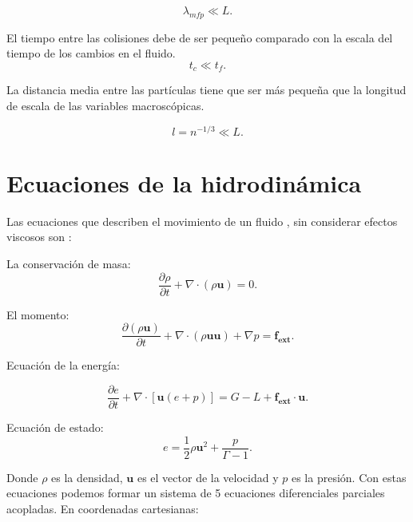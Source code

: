 \documentclass[12pt,a4paper]{book}
\begin{document}
\begin{equation}
\lambda_{mfp} \ll L.
\end{equation}

El tiempo entre las colisiones debe de ser pequeño comparado con la escala del tiempo de los cambios en el fluido.
\begin{equation}
t_{c} \ll t_f.
\end{equation}

La distancia media entre las partículas tiene que ser más pequeña que la longitud de escala de las variables macroscópicas.

\begin{equation}
l = n^{-1/3} \ll L.
\end{equation}



\section{Ecuaciones de la hidrodinámica}\label{sec:Ecuacioneshidrodinamica}

Las ecuaciones que describen el movimiento de un fluido \citep{Clarke2007}, sin considerar efectos viscosos son :

La conservación de masa: 
\begin{equation} \label{conservación_masa_hidrodinamica}
\dfrac{\partial \rho }{\partial t} + \nabla \cdot \left( \rho \mathbf{u} \right)=0.
\end{equation}

El momento:
\begin{equation}  \label{conservacion_momento_hidrodinamica}
\dfrac{\partial \left( \rho \mathbf{u} \right) }{\partial t}+ \nabla \cdot \left( \rho \mathbf{u u} \right) + \nabla p = \mathbf{f_{ext}}.
\end{equation}

Ecuación de la energía:

\begin{equation} \label{conservacion_energia_hidrodinamica}
\dfrac{\partial e }{\partial t} + \nabla \cdot \left[ \mathbf{u} \left( e+p \right) \right] =G-L+\mathbf{f_{ext} \cdot \mathbf{u}}.
\end{equation}

Ecuación de estado:
\begin{equation}
e=\frac{1}{2} \rho \mathbf{u}^{2} + \frac{p}{\Gamma - 1}.
\end{equation}

Donde $\rho$ es la densidad, $\mathbf{u}$ es el vector de la velocidad y $p$ es la presión.
Con estas ecuaciones podemos formar un sistema de 5 ecuaciones diferenciales parciales acopladas. En coordenadas cartesianas:
\end{document}
